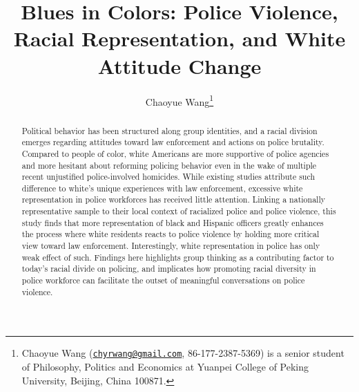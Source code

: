 \documentclass[11pt, letterpaper]{article}
\title{\textbf{Blues in Colors: Police Violence, Racial Representation, and White Attitude Change}}
\author{Chaoyue Wang\thanks{Chaoyue Wang (\href{mailto:chyrwang@gmail.com}{\texttt{chyrwang@gmail.com}}, 86-177-2387-5369) is a senior student of Philosophy, Politics and Economics at Yuanpei College of Peking University, Beijing, China 100871.}}
\begin{document}
 
\maketitle
\onehalfspacing %
\thispagestyle{empty}
\begin{abstract} %

\begin{normalsize}  \noindent   
Political behavior has been structured along group identities, and a racial division emerges regarding attitudes toward law enforcement and actions on police brutality. Compared to people of color, white Americans are more supportive of police agencies and more hesitant about reforming policing behavior even in the wake of multiple recent unjustified police-involved homicides. While existing studies attribute such difference to white's unique experiences with law enforcement, excessive white representation in police workforces has received little attention. Linking a nationally representative sample to their local context of racialized police and police violence, this study finds that more representation of black and Hispanic officers greatly enhances the process where white residents reacts to police violence by holding more critical view toward law enforcement. Interestingly, white representation in police has only weak effect of such. Findings here highlights group thinking as a contributing factor to today's racial divide on policing, and implicates how promoting racial diversity in police workforce can facilitate the outset of meaningful conversations on police violence.
\end{normalsize}
\end{abstract}


\newpage \clearpage {}  %
{}







%
\printbibliography
\newpage
\begin{appendix}



\end{appendix}
\end{document}
